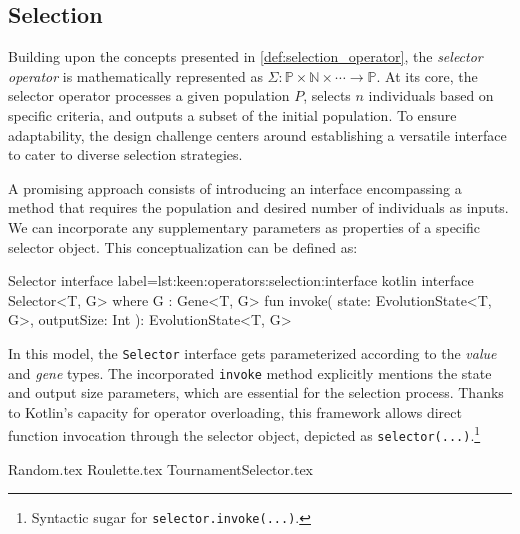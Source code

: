 \subsection{Selection}
\label{sec:keen:operators:selection}
  Building upon the concepts presented in \vref{def:selection_operator}, the 
  \emph{selector operator} is mathematically represented as \(\Sigma : \mathbb
  {P} \times \mathbb{N} \times \cdots \to \mathbb{P}\).
  At its core, the selector operator processes a given population 
  \(P\), selects \(n\) individuals based on specific criteria, and 
  outputs a subset of the initial population.
  To ensure adaptability, the design challenge centers around establishing a 
  versatile interface to cater to diverse selection strategies.

  A promising approach consists of introducing an interface encompassing a 
  method that requires the population and desired number of individuals as 
  inputs.
  We can incorporate any supplementary parameters as properties of a specific 
  selector object.
  This conceptualization can be defined as:

  \begin{code}{Selector interface}{
    label=lst:keen:operators:selection:interface
  }{kotlin}
    interface Selector<T, G> where G : Gene<T, G> {
        fun invoke(
            state: EvolutionState<T, G>, outputSize: Int
        ): EvolutionState<T, G>
    }
  \end{code}

  In this model, the \texttt{Selector} interface gets parameterized according 
  to the \textit{value} and \textit{gene} types.
  The incorporated \texttt{invoke} method explicitly mentions the state and 
  output size parameters, which are essential for the selection process.
  Thanks to Kotlin's capacity for operator overloading, this framework allows 
  direct function invocation through the selector object, depicted as \texttt
  {selector(...)}.\footnote{Syntactic sugar for \texttt{selector.invoke(...)}.}

  {Random.tex}
  {Roulette.tex}
  {TournamentSelector.tex}
